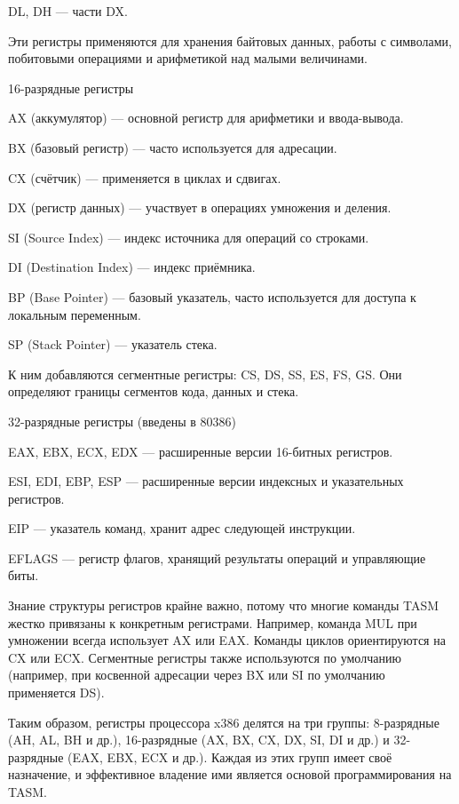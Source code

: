 DL, DH — части DX.

Эти регистры применяются для хранения байтовых данных, работы с символами, побитовыми операциями и арифметикой над малыми величинами.

16-разрядные регистры

AX (аккумулятор) — основной регистр для арифметики и ввода-вывода.

BX (базовый регистр) — часто используется для адресации.

CX (счётчик) — применяется в циклах и сдвигах.

DX (регистр данных) — участвует в операциях умножения и деления.

SI (Source Index) — индекс источника для операций со строками.

DI (Destination Index) — индекс приёмника.

BP (Base Pointer) — базовый указатель, часто используется для доступа к локальным переменным.

SP (Stack Pointer) — указатель стека.

К ним добавляются сегментные регистры: CS, DS, SS, ES, FS, GS. Они определяют границы сегментов кода, данных и стека.

32-разрядные регистры (введены в 80386)

EAX, EBX, ECX, EDX — расширенные версии 16-битных регистров.

ESI, EDI, EBP, ESP — расширенные версии индексных и указательных регистров.

EIP — указатель команд, хранит адрес следующей инструкции.

EFLAGS — регистр флагов, хранящий результаты операций и управляющие биты.

Знание структуры регистров крайне важно, потому что многие команды TASM жестко привязаны к конкретным регистрами. Например, команда MUL при умножении всегда использует AX или EAX. Команды циклов ориентируются на CX или ECX. Сегментные регистры также используются по умолчанию (например, при косвенной адресации через BX или SI по умолчанию применяется DS).

Таким образом, регистры процессора x386 делятся на три группы: 8-разрядные (AH, AL, BH и др.), 16-разрядные (AX, BX, CX, DX, SI, DI и др.) и 32-разрядные (EAX, EBX, ECX и др.). Каждая из этих групп имеет своё назначение, и эффективное владение ими является основой программирования на TASM.

\endinput
